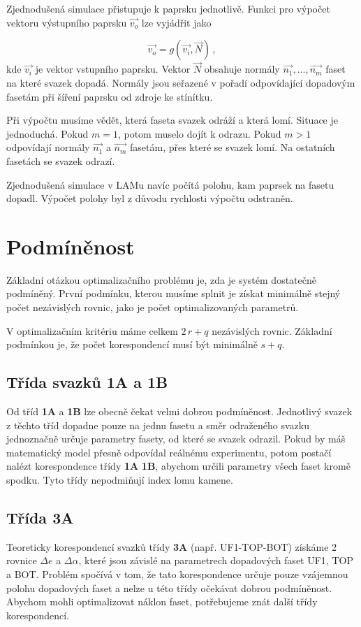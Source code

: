 Zjednodušená simulace přistupuje k paprsku jednotlivě. Funkci pro výpočet vektoru výstupního paprsku $\vec{v_o}$ lze vyjádřit jako  

\begin{equation}
\vec{v_o}= g\left(\vec{v_i},\vec{N} \right)\,,
\end{equation}
kde $\vec{v_i}$ je vektor vstupního paprsku. Vektor $\vec{N}$ obsahuje normály $\vec{n_1},\dots,\vec{n_m}$ faset na které svazek dopadá. Normály jsou seřazené v pořadí odpovídající dopadovým fasetám při šíření paprsku od zdroje ke stínítku. 

Při výpočtu musíme vědět, která faseta svazek odráží a která lomí. Situace je jednoduchá. Pokud $m = 1$, potom muselo dojít k odrazu. Pokud  $m > 1$  odpovídají normály $\vec{n_1}$ a $\vec{n_m}$ fasetám, přes které se svazek lomí. Na ostatních fasetách se svazek odrazí. 

Zjednodušená simulace v LAMu navíc počítá polohu, kam paprsek na fasetu dopadl. Výpočet polohy byl z důvodu rychlosti výpočtu odstraněn.



\section{Podmíněnost}
Základní otázkou optimalizačního problému je, zda je systém dostatečně podmíněný. První podmínku, kterou musíme splnit je získat minimálně stejný počet nezávislých rovnic, jako je počet optimalizovaných parametrů. 

V optimalizačním kritériu máme celkem  $2\,r + q$ nezávislých rovnic. Základní podmínkou je, že počet korespondencí musí být minimálně $ s+q $.

\subsection{Třída svazků \textbf{1A} a \textbf{1B}}
Od tříd \textbf{1A} a \textbf{1B} lze obecně čekat velmi dobrou podmíněnost. Jednotlivý svazek z těchto tříd dopadne pouze na jednu fasetu a směr odraženého svazku jednoznačně určuje parametry fasety, od které se svazek odrazil. Pokud by máš matematický model přesně odpovídal reálnému experimentu, potom postačí nalézt korespondence třídy \textbf{1A} \textbf{1B}, abychom určili parametry všech faset kromě spodku. Tyto třídy nepodmiňují index lomu kamene.
 
\subsection{Třída \textbf{3A}}
Teoreticky korespondencí svazků třídy \textbf{3A} (např. UF1-TOP-BOT) získáme 2 rovnice $\Delta e$ a $\Delta \alpha$, které jsou závislé na parametrech dopadových faset UF1, TOP a BOT. Problém spočívá v tom, že tato korespondence určuje pouze vzájemnou polohu dopadových faset a nelze u této třídy očekávat dobrou podmíněnost. 
Abychom mohli optimalizovat náklon faset, potřebujeme znát další třídy korespondencí.  

